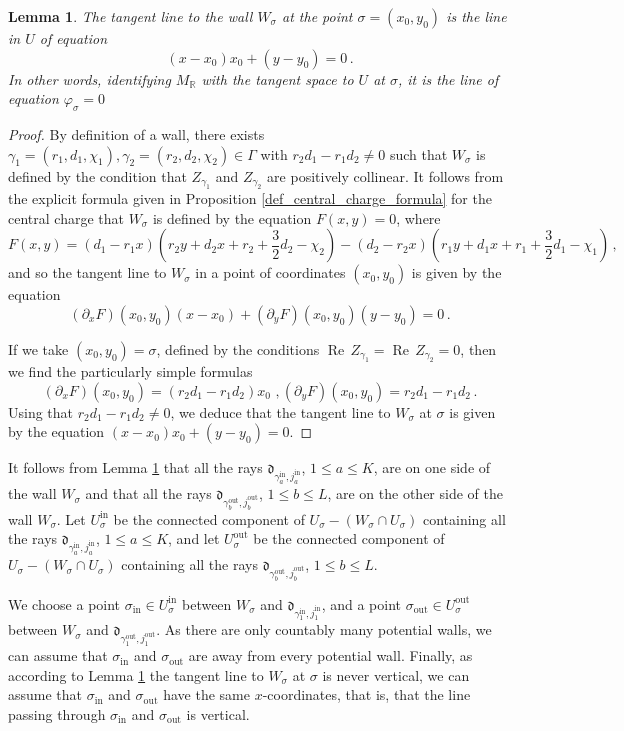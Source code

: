 \documentclass[12pt, a4paper]{amsart}
\newtheorem{lem}[defn]{Lemma}
\newcommand\R{\mathbb R}
\newcommand\fd{\mathfrak d}
\newcommand\Rea{\operatorname{Re}\,}
\newcommand\iin{\mathrm{in}}
\newcommand\oout{\mathrm{out}}
\begin{document}
\begin{lem} \label{key_lem_walls}
The tangent line to the wall $W_\sigma$ at the point 
$\sigma=(x_0,y_0)$ is the line in $U$ of equation
\[(x-x_0)x_0+(y-y_0)=0\,.\]
In other words, identifying $M_\R$ with the tangent
space to $U$ at $\sigma$, it is the line of equation 
$\varphi_\sigma=0$
\end{lem}

\begin{proof}
By definition of a wall, there exists 
$\gamma_1=(r_1,d_1,\chi_1), \gamma_2=(r_2,d_2,\chi_2)
\in \Gamma$ with 
$r_2 d_1-r_1 d_2 \neq 0$ such that $W_\sigma$ is defined by the condition that $Z_{\gamma_1}$ and $Z_{\gamma_2}$ are positively collinear. It follows from the explicit formula given in Proposition \ref{def_central_charge_formula} for the central charge that $W_\sigma$ is defined by the equation 
$F(x,y)=0$, where 
\[F(x,y)=(d_1-r_1x)(r_2 y +d_2 x+r_2+\frac{3}{2}d_2-\chi_2)
-(d_2-r_2 x)(r_1 y +d_1 x+r_1+\frac{3}{2}d_1-\chi_1)\,,\]
and so the tangent line to $W_{\sigma}$ in a point of coordinates 
$(x_0,y_0)$ is given by the equation 
\[(\partial_x F)(x_0,y_0)(x-x_0)+(\partial_y F)(x_0,y_0)(y-y_0)=0\,.\] 

If we take 
$(x_0,y_0)=\sigma$, defined by the conditions 
$\Rea Z_{\gamma_1}=\Rea Z_{\gamma_2}=0$, then we find the particularly simple formulas
\[(\partial_x F)(x_0,y_0)=(r_2 d_1-r_1 d_2) x_0 \,\,,
(\partial_y F)(x_0,y_0)=r_2d_1-r_1d_2\,.\]
Using that $r_2 d_1-r_1 d_2 \neq 0$, we deduce that the tangent line to $W_\sigma$ at $\sigma$ is given by the equation $(x-x_0)x_0+(y-y_0)=0$.
\end{proof}

It follows from Lemma \ref{key_lem_walls} that all the rays 
$\fd_{\gamma^\iin_a, j^\iin_a}$, $1 \leqslant a \leqslant K$, are on one side of the wall 
$W_\sigma$ and that all the rays
$\fd_{\gamma^\oout_b, j^\oout_b}$, $1 \leqslant b \leqslant L$, are on the other side of the wall
$W_\sigma$. Let $U_\sigma^{\iin}$ be the connected component of 
$U_\sigma -(W_\sigma \cap U_\sigma)$ containing all 
the rays $\fd_{\gamma^\iin_a, j^\iin_a}$, $1 \leqslant a \leqslant K$, 
and let 
$U_\sigma^{\oout}$ be the connected component of 
$U_\sigma - (W_\sigma \cap U_\sigma)$
containing all the rays $\fd_{\gamma^\oout_b, j^\oout_b}$, $1\leqslant b \leqslant L$.

We choose a point $\sigma_{\iin} \in U_\sigma^{\iin}$ between 
$W_\sigma$ and $\fd_{\gamma_1^\iin,j_1^\iin}$, and a point $\sigma_{\oout}
\in U_\sigma^{\oout}$ between $W_\sigma$ and $\fd_{\gamma_1^\oout, j_1^\oout}$.
As there are only countably many potential walls, we can assume that 
$\sigma_\iin$ and $\sigma_\oout$ are away from every potential wall. Finally, as
according to Lemma \ref{key_lem_walls} the tangent line to $W_\sigma$ at $\sigma$ is never vertical, we can assume that 
$\sigma_\iin$ and $\sigma_\oout$ have the same $x$-coordinates, that is, that the line passing through $\sigma_\iin$ and $\sigma_\oout$ is vertical.
\end{document}
